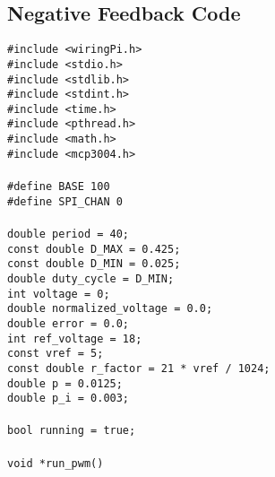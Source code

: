 \documentclass[a4paper, 12pt]{article}
\begin{document}
\begin{appendices}
	\section{Negative Feedback Code}
	\texttt{\#include <wiringPi.h>} \\\noindent
	\texttt{\#include <stdio.h>} \\\noindent
	\texttt{\#include <stdlib.h>} \\\noindent
	\texttt{\#include <stdint.h>} \\\noindent
	\texttt{\#include <time.h>} \\\noindent
	\texttt{\#include <pthread.h>} \\\noindent
	\texttt{\#include <math.h>} \\\noindent
	\texttt{\#include <mcp3004.h>} \\\noindent
	\texttt{ \\\noindent}
	\texttt{\#define BASE 100} \\\noindent
	\texttt{\#define SPI\_CHAN 0} \\\noindent
	\texttt{ \\\noindent}
	\texttt{double period = 40;} \\\noindent
	\texttt{const double D\_MAX = 0.425;} \\\noindent
	\texttt{const double D\_MIN = 0.025;} \\\noindent
	\texttt{double duty\_cycle = D\_MIN;} \\\noindent
	\texttt{int voltage = 0;} \\\noindent
	\texttt{double normalized\_voltage = 0.0;} \\\noindent
	\texttt{double error = 0.0;} \\\noindent
	\texttt{int ref\_voltage = 18;} \\\noindent
	\texttt{const vref = 5;} \\\noindent
	\texttt{const double r\_factor = 21 * vref / 1024;} \\\noindent
	\texttt{double p = 0.0125;} \\\noindent
	\texttt{double p\_i = 0.003;} \\\noindent
	\texttt{ \\\noindent}
	\texttt{bool running = true;} \\\noindent
	\texttt{ \\\noindent}
	\texttt{void *run\_pwm()} \\\noindent
	\texttt{{ \\\noindent}
}
\end{appendices}
\end{document}
